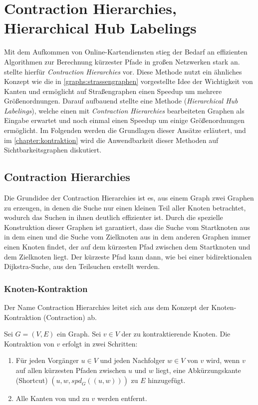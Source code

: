 \chapter{Contraction Hierarchies, Hierarchical Hub Labelings}\label{chapter:ch}

Mit dem Aufkommen von Online-Kartendiensten stieg der Bedarf an effizienten Algorithmen zur Berechnung kürzester Pfade in großen Netzwerken stark an.
\cite{geisberger2008contraction} stellte hierfür \emph{Contraction Hierarchies} vor.
Diese Methode nutzt ein ähnliches Konzept wie die in \autoref{graphs:strassengraphen} vorgestellte Idee der Wichtigkeit von Kanten und ermöglicht auf Straßengraphen einen Speedup um mehrere Größenordnungen.
Darauf aufbauend stellte \cite{abraham2011hub} eine Methode (\emph{Hierarchical Hub Labelings}), welche einen mit \emph{Contraction Hierarchies} bearbeiteten Graphen als Eingabe erwartet und noch einmal einen Speedup um einige Größenordnungen ermöglicht.
Im Folgenden werden die Grundlagen dieser Ansätze erläutert, und im \autoref{chapter:kontraktion} wird die Anwendbarkeit dieser Methoden auf Sichtbarkeitsgraphen diskutiert.

\section{Contraction Hierarchies}

Die Grundidee der Contraction Hierarchies ist es, aus einem Graph zwei Graphen zu erzeugen, in denen die Suche nur einen kleinen Teil aller Knoten betrachtet, wodurch das Suchen in ihnen deutlich effizienter ist.
Durch die spezielle Konstruktion dieser Graphen ist garantiert, dass die Suche vom Startknoten aus in dem einen und die Suche vom Zielknoten aus in dem anderen Graphen immer einen Knoten findet, der auf dem kürzesten Pfad zwischen dem Startknoten und dem Zielknoten liegt.
Der kürzeste Pfad kann dann, wie bei einer bidirektionalen Dijkstra-Suche, aus den Teilsuchen erstellt werden.

\subsection{Knoten-Kontraktion}

Der Name Contraction Hierarchies leitet sich aus dem Konzept der Knoten-Kontraktion (Contraction) ab.

\begin{definition}
    Sei $G = (V, E)$ ein Graph. Sei $v \in V$ der zu kontraktierende Knoten. Die Kontraktion von $v$ erfolgt in zwei Schritten:

    \begin{enumerate}
        \item\label{ch:contraction:when_shortcut}
        Für jeden Vorgänger $u \in V$ und jeden Nachfolger $w \in V$ von $v$ wird, wenn $v$ auf allen kürzesten Pfaden zwischen $u$ und $w$ liegt, eine Abkürzungskante (Shortcut) $(u, w, {spd}_G((u, w)))$ zu $E$ hinzugefügt.

        \item
              Alle Kanten von und zu $v$ werden entfernt.
    \end{enumerate}
\end{definition}

